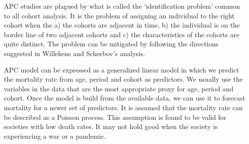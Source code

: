\documentclass{article}
\numberwithin{equation}{section}
\begin{document}
APC studies are plagued by what is called the `identification problem' common
to all cohort analysis. It is the problem of assigning an individual to the
right cohort when the a) the cohorts are adjacent in time, b) the individual 
is on the border line of two adjacent cohorts and c) the characteristics of
the cohorts are quite distinct. The problem can be mitigated by following
the directions suggested in Willekens and Scherbov's \cite{willekens1991age}
analysis.

APC model can be expressed as a generalized linear model in which we predict
the mortality rate from age, period and cohort as predictors. We usually use
the variables in the data that are the most appropriate proxy for age, period
and cohort. Once the model is build from the available data, we can use it to 
forecast mortality for a newer set of predictors. It is assumed that the 
mortality rate can be described as a Poisson process. This assumption is found 
to be valid for societies with low death rates. It may not hold good when 
the society is experiencing a war or a pandemic.
\end{document}
